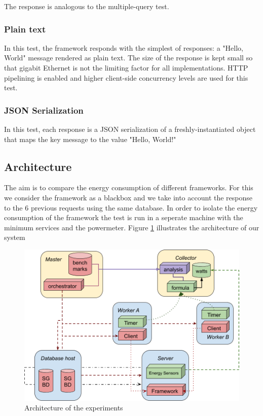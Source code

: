The response is analogous to the multiple-query test.

\subsubsection{Plain text}
In this test, the framework responds with the simplest of responses: a "Hello, World" message rendered as plain text. The size of the response is kept small so that gigabit Ethernet is not the limiting factor for all implementations. HTTP pipelining is enabled and higher client-side concurrency levels are used for this test.

\subsubsection{JSON Serialization}
In this test, each response is a JSON serialization of a freshly-instantiated object that maps the key message to the value "Hello, World!"



\subsection{Architecture}
The aim is to compare the energy consumption of different frameworks. For this we consider the framework as a blackbox and we take into account the response to the 6 previous requests using the same database.
In order to isolate the energy consumption of the framework the test is run in a seperate machine with the minimum services and the powermeter.
Figure \ref{fig:architecture} illustrates the architecture of our system

\begin{figure}\centering
    \includegraphics[width=.8\columnwidth]{imgs/architecture.png}
    \caption[Architecture]{Architecture of the experiments}
    \label{fig:architecture}
\end{figure}

